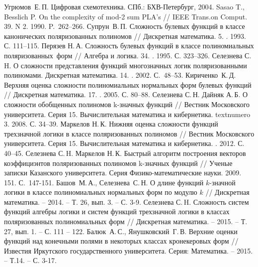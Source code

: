 \documentclass [12pt, a4paper] {extarticle}
\begin{document}
\begin{thebibliography}{0}
 Угрюмов~Е.\,П. Цифровая схемотехника. СПб.: БХВ-Петербург, 2004.
 Sasao T., Besslich P. On the complexity of mod-2 sum PLA’s  //
    IEEE Trans.on Comput. 39. N 2. 1990. P.~262--266.
 Супрун~В.\,П. Сложность булевых функций в классе канонических
    поляризованных полиномов // Дискретная математика. 5.
    . 1993. С. 111--115.
 Перязев Н.\,А. Сложность булевых функций в классе полиномиальных
    поляризованных~форм // Алгебра и логика. 34.
    . 1995. С. 323--326.
 Селезнева С.\,H. О сложности представления функций многозначных
    логик поляризованными полиномами. Дискретная
    математика. 14. . 2002. С.~48--53.
 Кириченко~К.\,Д. Верхняя оценка сложности полиномиальных
    нормальных форм булевых функций
    // Дискретная математика. 17. . 2005. С. 80--88.
 Селезнева С.\,Н. Дайняк А.\,Б. О сложности обобщенных
    полиномов k\nobreakdash-значных функций // Вестник Московского
    университета. Серия 15. Вычислительная математика и кибернетика. 
        textnumero 3. 2008. С. 34--39.
 Маркелов Н.\,К. Нижняя оценка сложности функций трехзначной
    логики в классе поляризованных полиномов // Вестник
    Московского университета. Серия 15. Вычислительная математика и
        кибернетика. . 2012. С. 40--45.
 Селезнева С.\,H. Маркелов Н.\,К. Быстрый алгоритм построения
    векторов коэффициэнтов поляризованных полиномов
    k-значных функций // Ученые записки Казанского университета. Серия
        Физико-математические науки. 2009. 151.
     С.~147-151.
 Башов~М.\,А., Селезнева~С.\,Н. О длине функций $k$-значной
    логики в классе полиномиальных нормальных
    форм по модулю $k$ // Дискретная математика. -- 2014. -- Т. 26,
        вып. 3. -- С. 3-9.
 Селезнева С.\,H. Сложность систем функций алгебры логики и
    систем функций трехзначной логики в классах
    поляризованных полиномиальных форм // Дискретная математика. -- 2015. --
        Т. 27, вып. 1. -- С. 111 -- 122. 
 Балюк~А.\,С., Янушковский~Г.\,В. Верхние оценки функций над
    конечными полями в некоторых классах
    кронекеровых форм // Известия Иркутского государственного университета.
        Серия: Математика. -- 2015. -- Т.14. -- С. 3-17.
\end{thebibliography}
\end{document}
